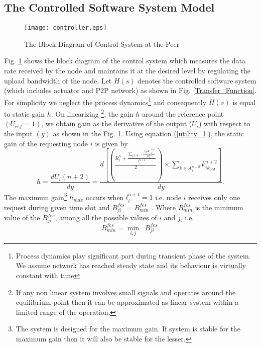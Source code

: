 \documentclass[journal]{IEEEtran}
\begin{document}
\subsection{The Controlled Software System Model}
\label{The Controlled Software System Model}
\begin{figure}
	\centering
	\texttt{[image: controller.eps]}
	\caption{The Block Diagram of Control System at the Peer}
\label{control block}
\end{figure}  
Fig. \ref{control block} shows the block diagram of the control system which measures the data rate received by the node and maintains it at the desired level by regulating the upload bandwidth of the node. Let $H(s)$ denotes the controlled software system (which includes actuator and P2P network) as shown in Fig. \ref{Transfer_Function}. For simplicity we neglect the process dynamics\footnote{Process dynamics play significant part during transient phase of the system. We assume network has reached steady state and its behaviour is virtually constant with time} and consequently $H(s)$ is equal to static gain $h$. On linearizing \footnote{If any non linear system involves small signals and operates around the equilibrium point then it can be approximated as linear system within a limited range of the operation.}, the gain $h$ \cite{Ogata} around the reference point $(U_{ref}=1)$, we obtain gain as the  derivative of the output ($U_i$) with respect to the input $(y)$ as shown in the Fig. \ref{control block}. Using equation (\ref{utility_1}), the static gain of the requesting node $i$ is given by 
\begin{equation}
	\label{S_gain}
	h=\frac{dU_i(n+2)}{dy}=\frac{d\left[\left(\frac{{R_{i}^{n}}+{\frac{\sum\limits_{j\in{S^{n+1}_i}}\frac{(y\Delta)_{ji}^{n+1}}{B_{ji}^{fes}}}{l_i^{n+1}}}}{2}\right)\times{\sum\limits_{k\in{A^{n+2}_i}}k_{{ik}_{ovd}}^{n+2}}\right]}{dy}.
\end{equation}
The maximum gain\footnote{The system is designed for the maximum gain. If system is stable for the maximum gain then it will also be stable for the lesser.} $h_{max}$ occurs when $l_i^{n+1}=1$ i.e. node $i$ receives only one request during given time slot and $B_{ji}^{fes}=B^{fes}_{min}$ . Where $B^{fes}_{min}$ is the minimum value of the $B_{ji}^{fes}$, among all the possible values of $i$ and $j$, i.e. 
\begin{equation}
	\nonumber
	B^{fes}_{min}= \min_{i,j} \;\; B_{ji}^{fes}.
\end{equation}
\end{document}
